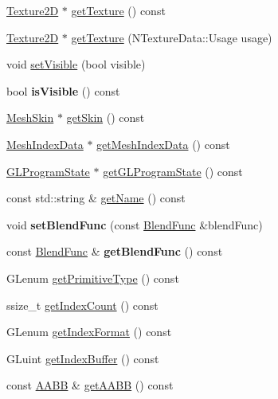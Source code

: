 \begin{DoxyCompactItemize}
\item 
\hyperlink{classTexture2D}{Texture2D} $\ast$ \hyperlink{classMesh_a50d6d1de8a7cafa24743acf6de58f1e8}{get\+Texture} () const
\item 
\hyperlink{classTexture2D}{Texture2D} $\ast$ \hyperlink{classMesh_a541ccc1451f8c8c6554f5e7f824714ef}{get\+Texture} (N\+Texture\+Data\+::\+Usage usage)
\item 
void \hyperlink{classMesh_a4b1d195f81afe1429d5fdffeaab2a25b}{set\+Visible} (bool visible)
\item 
\mbox{\label{classMesh_aaeec81b4b67053332bb0744a1d44449f}} 
bool {\bfseries is\+Visible} () const
\item 
\hyperlink{classMeshSkin}{Mesh\+Skin} $\ast$ \hyperlink{classMesh_a2d8bd33f1b0978afe7fbc37359b7e8a9}{get\+Skin} () const
\item 
\hyperlink{classMeshIndexData}{Mesh\+Index\+Data} $\ast$ \hyperlink{classMesh_abbe2d7d3d9cbefc55576375fdca32ecd}{get\+Mesh\+Index\+Data} () const
\item 
\hyperlink{classGLProgramState}{G\+L\+Program\+State} $\ast$ \hyperlink{classMesh_a146c364e9ac9e83dc1b59a07d2c47653}{get\+G\+L\+Program\+State} () const
\item 
const std\+::string \& \hyperlink{classMesh_a87a6913ba3a4220a77c011ca7f75045d}{get\+Name} () const
\item 
\mbox{\label{classMesh_ac339d2e0c82b8004b8a46aee48728c75}} 
void {\bfseries set\+Blend\+Func} (const \hyperlink{structBlendFunc}{Blend\+Func} \&blend\+Func)
\item 
\mbox{\label{classMesh_a8e066740dd314e3ef00a9eb40f2c2cdb}} 
const \hyperlink{structBlendFunc}{Blend\+Func} \& {\bfseries get\+Blend\+Func} () const
\item 
G\+Lenum \hyperlink{classMesh_a1b3969fa1a815cafb840cb7ab8a83ad7}{get\+Primitive\+Type} () const
\item 
ssize\+\_\+t \hyperlink{classMesh_a7ae6ed2eb06a5cbf4f3154b7fa668a4d}{get\+Index\+Count} () const
\item 
G\+Lenum \hyperlink{classMesh_a1d23b78ab2e51b134ae79acd2754f45c}{get\+Index\+Format} () const
\item 
G\+Luint \hyperlink{classMesh_a2b30616b2101f88ffdbef2720538f9d6}{get\+Index\+Buffer} () const
\item 
const \hyperlink{classAABB}{A\+A\+BB} \& \hyperlink{classMesh_a62a70c82c57dabc8c728756df13c805d}{get\+A\+A\+BB} () const

\end{DoxyCompactItemize}
